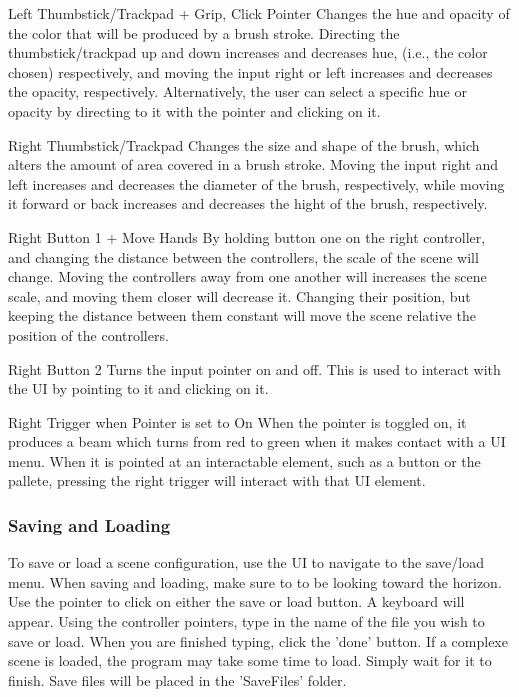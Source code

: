 \documentclass[onecolumn, draftclsnofoot,10pt, compsoc]{IEEEtran}
\newcounter{threesection}[subsubsection]
\begin{document}
Left Thumbstick/Trackpad + Grip, Click Pointer Changes the hue and opacity of the color that will be produced by a brush stroke.
Directing the thumbstick/trackpad up and down increases and decreases hue, (i.e., the color chosen) respectively, and moving the input right or left increases and decreases the opacity, respectively.
Alternatively, the user can select a specific hue or opacity by directing to it with the pointer and clicking on it.

Right Thumbstick/Trackpad Changes the size and shape of the brush, which alters the amount of area covered in a brush stroke.
Moving the input right and left increases and decreases the diameter of the brush, respectively, while moving it forward or back increases and decreases the hight of the brush, respectively.

Right Button 1 + Move Hands By holding button one on the right controller, and changing the distance between the controllers, the scale of the scene will change.
Moving the controllers away from one another will increases the scene scale, and moving them closer will decrease it.
Changing their position, but keeping the distance between them constant will move the scene relative the position of the controllers.

Right Button 2 Turns the input pointer on and off.
This is used to interact with the UI by pointing to it and clicking on it.

Right Trigger when Pointer is set to On When the pointer is toggled on, it produces a beam which turns from red to green when it makes contact with a UI menu.
When it is pointed at an interactable element, such as a button or the pallete, pressing the right trigger will interact with that UI element.

\subsubsection{Saving and Loading}
To save or load a scene configuration, use the UI to navigate to the save/load menu.
When saving and loading, make sure to to be looking toward the horizon.
Use the pointer to click on either the save or load button.
A keyboard will appear.
Using the controller pointers, type in the name of the file you wish to save or load.
When you are finished typing, click the 'done' button.
If a complexe scene is loaded, the program may take some time to load. 
Simply wait for it to finish.
Save files will be placed in the 'SaveFiles' folder.
\end{document}
